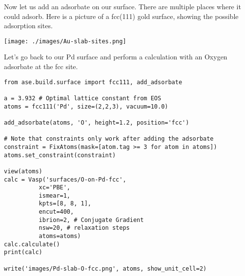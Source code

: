 \documentclass[11pt]{article}
\begin{document}
Now let us add an adsorbate on our surface. There are multiple places where it could adsorb. Here is a picture of a fcc(111) gold surface, showing the possible adsorption sites. 


\begin{center}
\texttt{[image: ./images/Au-slab-sites.png]}
\end{center}


Let's go back to our Pd surface and perform a calculation with an Oxygen adsorbate at the fcc site.

\begin{verbatim}
from ase.build.surface import fcc111, add_adsorbate

a = 3.932 # Optimal lattice constant from EOS
atoms = fcc111('Pd', size=(2,2,3), vacuum=10.0)

add_adsorbate(atoms, 'O', height=1.2, position='fcc')

# Note that constraints only work after adding the adsorbate
constraint = FixAtoms(mask=[atom.tag >= 3 for atom in atoms])
atoms.set_constraint(constraint)

view(atoms)
calc = Vasp('surfaces/O-on-Pd-fcc',
          xc='PBE',
          ismear=1,
          kpts=[8, 8, 1],
          encut=400,
          ibrion=2, # Conjugate Gradient
          nsw=20, # relaxation steps
          atoms=atoms)
calc.calculate()
print(calc)
    
write('images/Pd-slab-O-fcc.png', atoms, show_unit_cell=2)    
\end{verbatim}
\end{document}
